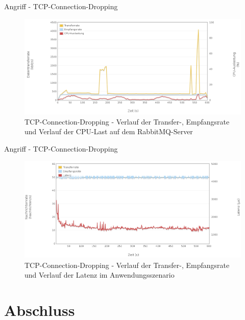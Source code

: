 \documentclass[10pt]{beamer}
\begin{document}
\begin{frame}{Angriff - TCP-Connection-Dropping}
\begin{figure}[!htb]
	\centering
	\includegraphics[width=\textwidth]{img/tcpdrop/tcpdrop_server2.png}
	\caption{\centering TCP-Connection-Dropping - Verlauf der Transfer-, Empfangsrate und Verlauf der CPU-Last auf dem RabbitMQ-Server}
	\label{fig:tcpdrop-server2}
\end{figure}
\end{frame}

\begin{frame}{Angriff - TCP-Connection-Dropping}
\begin{figure}[!htb]
	\centering
	\includegraphics[width=\textwidth]{img/tcpdrop/tcpdrop_scenario.png}
	\caption{\centering TCP-Connection-Dropping - Verlauf der Transfer-, Empfangsrate und Verlauf der Latenz im Anwendungsszenario}
	\label{fig:tcpdrop-scenario}
\end{figure}
\end{frame}


\section{Abschluss}
\end{document}
